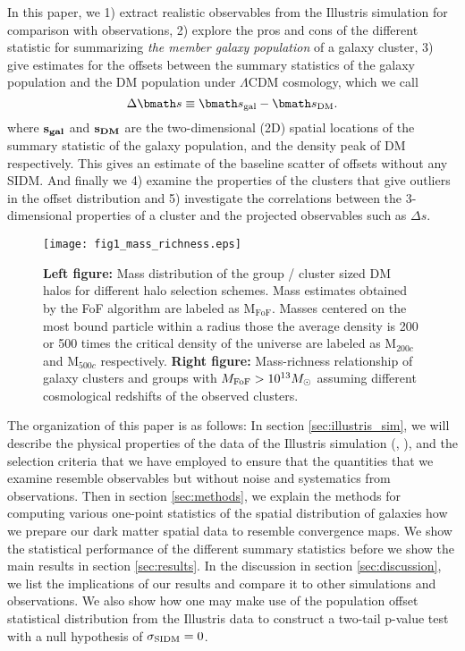 In this paper, we 
1) extract realistic observables from the Illustris simulation for
comparison with observations, 2) explore the pros and cons of the different statistic for 
summarizing {\it the member galaxy population} of a galaxy cluster, 3)	
give estimates for the offsets between the summary statistics of the galaxy  
population and the DM population under $\Lambda$CDM cosmology, which we call 
\begin{equation}
	\Delta \vec{s} \equiv \vec{s}_{\rm gal} - \vec{s}_{\rm DM}.
\end{equation}
where $\bf{s}_{gal}$ and $\bf{s}_{DM}$ are the two-dimensional (2D) spatial
locations of the summary statistic of the galaxy population, and the density
peak of DM respectively. This gives
an estimate of the baseline scatter of offsets without any SIDM. And finally we 
4) examine the properties of the clusters that give outliers in 
the offset distribution and 5) investigate the  
correlations between the 3-dimensional properties of a cluster and the projected 
observables such as $\Delta s$. 
\begin{figure*}
	\texttt{[image: fig1\_mass\_richness.eps]}
	\caption{ {\bf Left figure:} Mass distribution of the group / cluster sized 
		DM halos for different halo selection schemes. Mass estimates obtained by the
		FoF algorithm are labeled as  M$_{\text{FoF}}$.
		Masses centered on the most bound particle within a radius those the 
		average density is 200 or 500 times the critical density of the universe are 
		labeled as M$_{200c}$ and M$_{500c}$ respectively. 
		{\bf Right figure:} 
		Mass-richness relationship of galaxy clusters and groups with 
		$M_{\rm FoF} > 10^{13} M_{\odot}$ assuming different cosmological redshifts
		of the observed clusters. 
\label{fig:mass_richness}}
\end{figure*}

The organization of this paper is as follows:
In section \ref{sec:illustris_sim}, we will describe the physical properties of 
the data of the Illustris
simulation (\citealt{Vogelsberger2014}, \citealt{Genel2014a}), 
and the selection criteria that we have employed to ensure that the
quantities that we examine resemble observables but without noise and
systematics from observations. 
Then in section \ref{sec:methods}, 
we explain the methods for computing various 
one-point statistics of the spatial distribution of galaxies how we prepare our dark
matter spatial data to resemble convergence maps. We show the statistical performance
of the different summary statistics before we show the main results
in section \ref{sec:results}. In the discussion in section \ref{sec:discussion}, 
we list the implications of our
results and compare it to other simulations and observations. We also 
show how one may make use of the population offset statistical distribution
from the Illustris data to construct a two-tail p-value test with 
a null hypothesis of $\sigma_{\rm SIDM} = 0$. 

